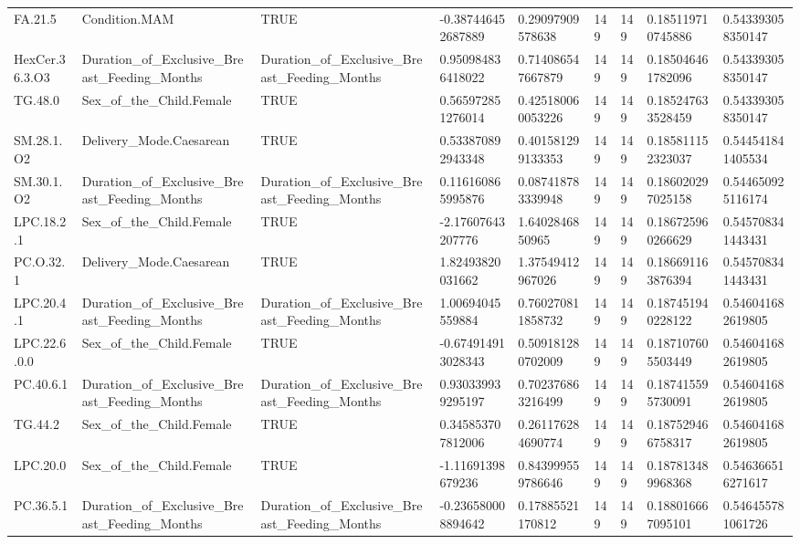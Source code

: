 \begin{longtable}{lllllllll}
FA.21.5 & Condition.MAM & TRUE & -0.387446452687889 & 0.29097909578638 & 149 & 149 & 0.185119710745886 & 0.543393058350147 \\
HexCer.36.3.O3 & Duration\_of\_Exclusive\_Breast\_Feeding\_Months & Duration\_of\_Exclusive\_Breast\_Feeding\_Months & 0.950984836418022 & 0.714086547667879 & 149 & 149 & 0.185046461782096 & 0.543393058350147 \\
TG.48.0 & Sex\_of\_the\_Child.Female & TRUE & 0.565972851276014 & 0.425180060053226 & 149 & 149 & 0.185247633528459 & 0.543393058350147 \\
SM.28.1.O2 & Delivery\_Mode.Caesarean & TRUE & 0.533870892943348 & 0.401581299133353 & 149 & 149 & 0.185811152323037 & 0.544541841405534 \\
SM.30.1.O2 & Duration\_of\_Exclusive\_Breast\_Feeding\_Months & Duration\_of\_Exclusive\_Breast\_Feeding\_Months & 0.116160865995876 & 0.087418783339948 & 149 & 149 & 0.186020297025158 & 0.544650925116174 \\
LPC.18.2.1 & Sex\_of\_the\_Child.Female & TRUE & -2.17607643207776 & 1.6402846850965 & 149 & 149 & 0.186725960266629 & 0.545708341443431 \\
PC.O.32.1 & Delivery\_Mode.Caesarean & TRUE & 1.82493820031662 & 1.37549412967026 & 149 & 149 & 0.186691163876394 & 0.545708341443431 \\
LPC.20.4.1 & Duration\_of\_Exclusive\_Breast\_Feeding\_Months & Duration\_of\_Exclusive\_Breast\_Feeding\_Months & 1.00694045559884 & 0.760270811858732 & 149 & 149 & 0.187451940228122 & 0.546041682619805 \\
LPC.22.6.0.0 & Sex\_of\_the\_Child.Female & TRUE & -0.674914913028343 & 0.509181280702009 & 149 & 149 & 0.187107605503449 & 0.546041682619805 \\
PC.40.6.1 & Duration\_of\_Exclusive\_Breast\_Feeding\_Months & Duration\_of\_Exclusive\_Breast\_Feeding\_Months & 0.930339939295197 & 0.702376863216499 & 149 & 149 & 0.187415595730091 & 0.546041682619805 \\
TG.44.2 & Sex\_of\_the\_Child.Female & TRUE & 0.345853707812006 & 0.261176284690774 & 149 & 149 & 0.187529466758317 & 0.546041682619805 \\
LPC.20.0 & Sex\_of\_the\_Child.Female & TRUE & -1.11691398679236 & 0.843999559786646 & 149 & 149 & 0.187813489968368 & 0.546366516271617 \\
PC.36.5.1 & Duration\_of\_Exclusive\_Breast\_Feeding\_Months & Duration\_of\_Exclusive\_Breast\_Feeding\_Months & -0.236580008894642 & 0.17885521170812 & 149 & 149 & 0.188016667095101 & 0.546455781061726 \\

\end{longtable}
